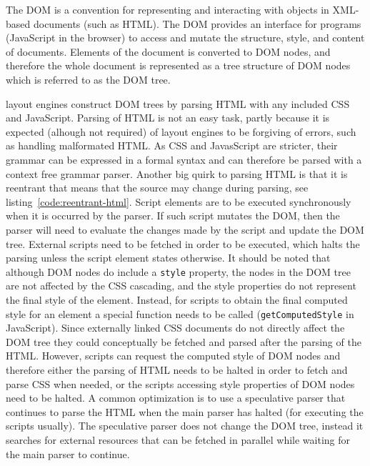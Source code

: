\documentclass[a4paper,11pt]{kth-mag}
\newcommand{\code}[1]{\texttt{#1}}
\begin{document}
        The \gls{DOM} is a convention for representing and interacting with objects in \gls{XML}-based \glspl{document} (such as \gls{HTML}).
        The \gls{DOM} provides an interface for programs (\gls{JavaScript} in the \gls{browser}) to access and mutate the structure, style, and content of \glspl{document}.
        Elements of the \gls{document} is converted to \gls{DOM} nodes, and therefore the whole \gls{document} is represented as a tree structure of \gls{DOM} nodes which is referred to as the \gls{DOM} tree.

        \Glspl{layout engine} construct \gls{DOM} trees by parsing \gls{HTML} with any included \gls{CSS} and \gls{JavaScript}.
        Parsing of \gls{HTML} is not an easy task, partly because it is expected (alhough not required) of layout engines to be forgiving of errors, such as handling malformated \gls{HTML}.
        As \gls{CSS} and JavasScript are stricter, their grammar can be expressed in a formal syntax and can therefore be parsed with a context free grammar parser.
        Another big quirk to parsing \gls{HTML} is that it is reentrant that means that the source may change during parsing, see listing~\ref{code:reentrant-html}.
        Script \glspl{element} are to be executed synchronously when it is occurred by the parser.
        If such script mutates the \gls{DOM}, then the parser will need to evaluate the changes made by the script and update the \gls{DOM} tree.
        External scripts need to be fetched in order to be executed, which halts the parsing unless the script \gls{element} states otherwise.
        It should be noted that although \gls{DOM} nodes do include a \code{style} property, the nodes in the \gls{DOM} tree are not affected by the \gls{CSS} cascading, and the style properties do not represent the final style of the \gls{element}.
        Instead, for scripts to obtain the final computed style for an \gls{element} a special function needs to be called (\code{getComputedStyle} in \gls{JavaScript}).
        Since externally linked \gls{CSS} \glspl{document} do not directly affect the \gls{DOM} tree they could conceptually be fetched and parsed after the parsing of the \gls{HTML}.
        However, scripts can request the computed style of \gls{DOM} nodes and therefore either the parsing of \gls{HTML} needs to be halted in order to fetch and parse \gls{CSS} when needed, or the scripts accessing style properties of \gls{DOM} nodes need to be halted.
        A common optimization is to use a speculative parser that continues to parse the \gls{HTML} when the main parser has halted (for executing the scripts usually).
        The speculative parser does not change the \gls{DOM} tree, instead it searches for external resources that can be fetched in parallel while waiting for the main parser to continue.
\end{document}
